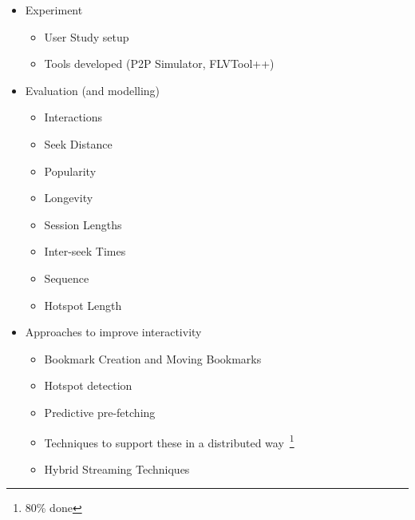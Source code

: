 \begin{itemize}
\begin{itemize}
        \item Discussion on Interactivity and how it breaks streaming
        \begin{itemize}
            \item Introduction
            \item Push/Pull Techniques~\footnote{incorporating Andy's Hybrid work.}\saveFN\andy\
            \item Hybrid concepts~\useFN\andy\
        \end{itemize}

        \item Papers about VoD systems, such as YouTube, and M\$'s
        \begin{itemize}
            \item Overview
            \item Describe what's typical on these services
            \item Describe what problems they have
        \end{itemize}

    \end{itemize}

    \item Experiment
    \begin{itemize}
        \item User Study setup
        \item Tools developed (P2P Simulator, FLVTool++)
    \end{itemize}

    \item Evaluation (and modelling)
    \begin{itemize}
        \item Interactions
        \item Seek Distance
        \item Popularity
        \item Longevity
        \item Session Lengths
        \item Inter-seek Times
        \item Sequence
        \item Hotspot Length
    \end{itemize}

    \item Approaches to improve interactivity
    \begin{itemize}
        \item Bookmark Creation and Moving Bookmarks
        \item Hotspot detection
        \item Predictive pre-fetching
        \item Techniques to support these in a distributed way~\footnote{80\% done}
        \item Hybrid Streaming Techniques~\useFN\andy\
    \end{itemize}


\end{itemize}
